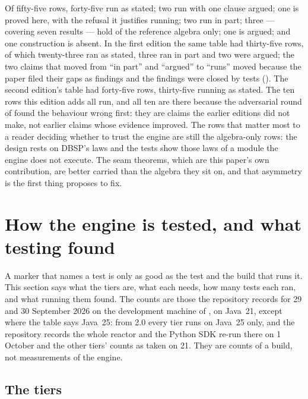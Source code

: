 \documentclass[11pt,a4paper]{article}
\renewcommand{\_}{\oldunderscore\allowbreak}
\begin{document}
Of fifty-five rows, forty-five run as stated; two run with one clause argued; one is proved here,
with the refusal it justifies running; two run in part; three --- covering seven results --- hold of the
reference algebra only; one is argued; and one construction is absent. In the first edition the same
table had thirty-five rows, of which twenty-three ran as stated, three ran in part and two were argued;
the two claims that moved from ``in part'' and ``argued'' to ``runs'' moved because the paper filed their
gaps as findings and the findings were closed by tests (). The second edition's table
had forty-five rows, thirty-five running as stated. The ten rows this edition adds all run, and all ten
are there because the adversarial round of  found the behaviour wrong first: they are
claims the earlier editions did not make, not earlier claims whose evidence improved. The rows that matter most
to a reader deciding whether to trust the engine are still the algebra-only rows: the design rests on
DBSP's laws and the tests show those laws of a module the engine does not execute. The seam theorems,
which are this paper's own contribution, are better carried than the algebra they sit on, and that
asymmetry is the first thing  proposes to fix.

\section{How the engine is tested, and what testing found}\label{sec:testing}

A marker that names a test is only as good as the test and the build that runs it. This section says
what the tiers are, what each needs, how many tests each ran, and what running them found. The counts
are those the repository records for 29 and 30 September 2026 on the development machine of
, on Java~21, except where the table says Java~25: from 2.0 every tier runs on
Java~25 only, and the repository records the whole reactor and the Python SDK re-run there on 1 October
and the other tiers' counts as taken on 21. They are counts of a build, not measurements of the engine.

\subsection{The tiers}
\end{document}
